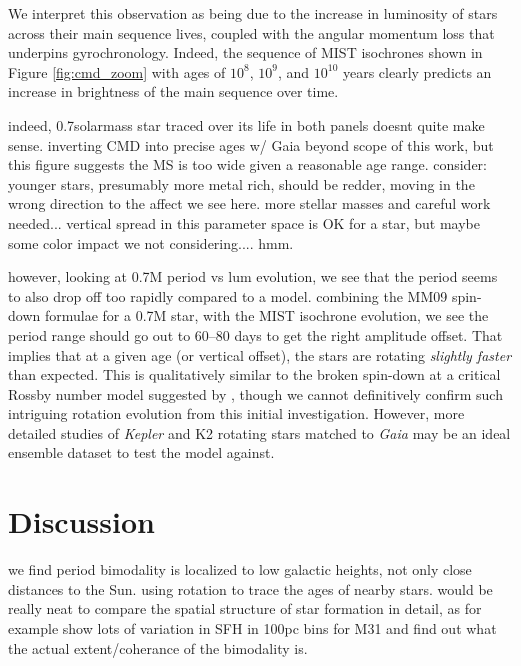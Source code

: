 \documentclass[preprint2]{aastex62}
\newcommand{\Kepler}{\textsl{Kepler}\xspace}
\begin{document}
We interpret this observation as being due to the increase in luminosity of stars across their main sequence lives, coupled with the angular momentum loss that underpins gyrochronology. Indeed, the sequence of MIST isochrones shown in Figure \ref{fig:cmd_zoom} with ages of $10^8$, $10^9$, and $10^{10}$ years clearly predicts an increase in brightness of the main sequence over time. 

indeed, 0.7solarmass star traced over its life in both panels doesnt quite make sense. 
inverting CMD into precise ages w/ Gaia beyond scope of this work, but this figure suggests the MS is too wide given a reasonable age range. consider: younger stars, presumably more metal rich, should be redder, moving in the wrong direction to the affect we see here. more stellar masses and careful work needed... vertical spread in this parameter space is OK for a star, but maybe some color impact we not considering.... hmm.

however, looking at 0.7M period vs lum evolution, we see that the period seems to also drop off too rapidly compared to a model. combining the MM09 spin-down formulae for a 0.7M star, with the MIST isochrone evolution, we see  the period range should go out to 60--80 days to get the right amplitude offset. That implies that at a given age (or vertical offset), the stars are rotating {\it slightly faster} than expected. This is qualitatively similar to the broken spin-down at a critical Rossby number model suggested by \citet{van-saders2016}, though we cannot definitively confirm such intriguing rotation evolution from this initial investigation.
However, more detailed studies of \Kepler and K2 rotating stars matched to {\em Gaia} may be an ideal ensemble dataset to test the \citet{van-saders2016} model against.








\section{Discussion}

%

we find period bimodality is localized to low galactic heights, not only close distances to the Sun.
using rotation to trace the ages of nearby stars. would be really neat to compare the spatial structure of star formation in detail, as 
\citet{lewis2015} for example show lots of variation in SFH in 100pc bins for M31
and find out what the actual extent/coherance of the bimodality is. 
\end{document}
